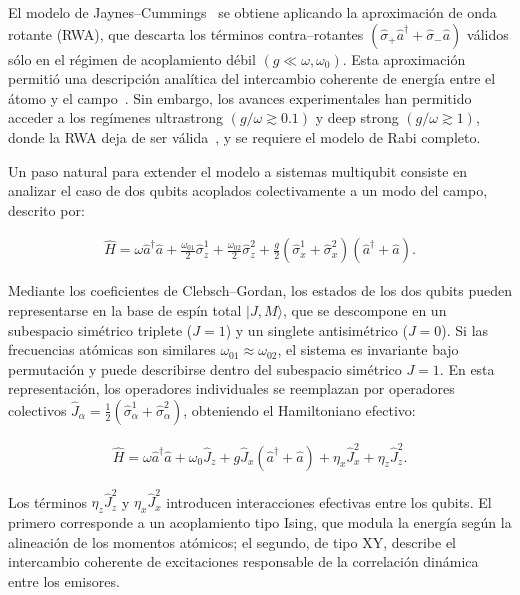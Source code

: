 \documentclass[onecolumn,notitlepage,letterpaper,aps,pra,12pt]{article}
\numberwithin{equation}{section}
\begin{document}
El modelo de Jaynes–Cummings~\cite{Jaynes1963} se obtiene aplicando la aproximación de onda rotante (RWA), que descarta los términos contra–rotantes $(\hat{\sigma}_{+}\hat{a}^{\dagger} + \hat{\sigma}_{-}\hat{a})$ válidos sólo en el régimen de acoplamiento débil $(g \ll \omega,\omega_{0})$. Esta aproximación permitió una descripción analítica del intercambio coherente de energía entre el átomo y el campo~\cite{wallraff2004,Schoelkopf2008,devoret2013}. Sin embargo, los avances experimentales han permitido acceder a los regímenes ultrastrong $(g/\omega \gtrsim 0.1)$ y deep strong $(g/\omega \gtrsim 1)$, donde la RWA deja de ser válida~\cite{FornDiaz2019,Yoshihara2017}, y se requiere el modelo de Rabi completo.

Un paso natural para extender el modelo a sistemas multiqubit consiste en analizar el caso de dos qubits acoplados colectivamente a un modo del campo, descrito por:

\begin{gather}
    \hat{H} = \omega\hat{a}^{\dagger}\hat{a} + \frac{\omega_{01}}{2}\hat{\sigma}_{z}^{1} + \frac{\omega_{02}}{2}\hat{\sigma}_{z}^{2} + \frac{g}{2}\left(\hat{\sigma}_{x}^{1}+\hat{\sigma}_{x}^{2}\right)(\hat{a}^{\dagger}+\hat{a}).
\end{gather}

Mediante los coeficientes de Clebsch–Gordan, los estados de los dos qubits pueden representarse en la base de espín total \( |J,M\rangle \), que se descompone en un subespacio simétrico triplete (\(J=1\)) y un singlete antisimétrico (\(J=0\)). Si las frecuencias atómicas son similares \(\omega_{01} \approx \omega_{02}\), el sistema es invariante bajo permutación y puede describirse dentro del subespacio simétrico \(J=1\). En esta representación, los operadores individuales se reemplazan por operadores colectivos \(\hat{J}_{\alpha}=\tfrac{1}{2}(\hat{\sigma}_{\alpha}^{1}+\hat{\sigma}_{\alpha}^{2})\), obteniendo el Hamiltoniano efectivo:

\begin{gather}\label{Hamiltoniano de Rabi dos qubits con interacciones}
    \hat{H} = \omega \hat{a}^{\dagger}\hat{a} + \omega_{0} \hat{J}_{z} + g \hat{J}_{x} (\hat{a}^{\dagger} + \hat{a}) + \eta_{x} \hat{J}_{x}^{2} + \eta_{z} \hat{J}_{z}^{2}.
\end{gather}

Los términos \(\eta_{z}\hat{J}_{z}^{2}\) y \(\eta_{x}\hat{J}_{x}^{2}\) introducen interacciones efectivas entre los qubits. El primero corresponde a un acoplamiento tipo Ising, que modula la energía según la alineación de los momentos atómicos; el segundo, de tipo XY, describe el intercambio coherente de excitaciones responsable de la correlación dinámica entre los emisores.
\end{document}
